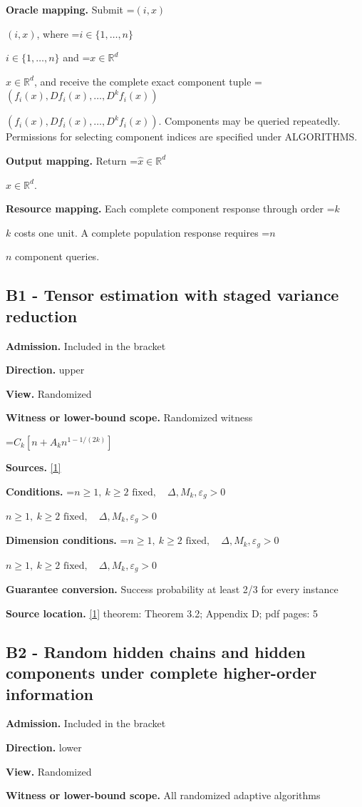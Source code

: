 \documentclass[10pt,a4paper]{article}
\newcommand{\AtlasMath}[1]{\par\begingroup\centering\setbox0=\hbox{$\displaystyle #1$}\ifdim\wd0>1.4\linewidth\typeout{ATLAS WIDE FORMULA: \the\wd0}\fi\ifdim\wd0>\linewidth\resizebox{\linewidth}{!}{\box0}\else\box0\fi\par\endgroup}
\newcommand{\AtlasInlineMath}[1]{\begingroup\setbox0=\hbox{$#1$}\ifdim\wd0>.4\linewidth\endgroup\AtlasMath{#1}\else\endgroup$#1$\fi}
\begin{document}
\textbf{Oracle mapping.} Submit \AtlasInlineMath{(i,x)}, where \AtlasInlineMath{i\in\{1,\ldots,n\}} and \AtlasInlineMath{x\in\mathbb{R}^d}, and receive the complete exact component tuple \AtlasInlineMath{(f_i(x),Df_i(x),\ldots,D^{k}f_i(x))}. Components may be queried repeatedly. Permissions for selecting component indices are specified under ALGORITHMS.

\textbf{Output mapping.} Return \AtlasInlineMath{\widehat{x}\in \mathbb{R}^d}.

\textbf{Resource mapping.} Each complete component response through order \AtlasInlineMath{k} costs one unit. A complete population response requires \AtlasInlineMath{n} component queries.

\subsection{B1 - Tensor estimation with staged variance reduction}
\textbf{Admission.} Included in the bracket

\textbf{Direction.} upper

\textbf{View.} Randomized

\textbf{Witness or lower-bound scope.} Randomized witness

\AtlasMath{C_k[n+A_kn^{1-1/(2k)}]}
\textbf{Sources.} \href{https://arxiv.org/pdf/2609.28202v2}{[1]}

\textbf{Conditions.} \AtlasInlineMath{n\ge1,\ k\ge2\text{ fixed},\quad\Delta,M_k,\varepsilon_g>0}

\textbf{Dimension conditions.} \AtlasInlineMath{n\ge1,\ k\ge2\text{ fixed},\quad\Delta,M_k,\varepsilon_g>0}

\textbf{Guarantee conversion.} Success probability at least 2/3 for every instance

\textbf{Source location.} \href{https://arxiv.org/pdf/2609.28202v2}{[1]} theorem: Theorem 3.2; Appendix D; pdf pages: 5

\subsection{B2 - Random hidden chains and hidden components under complete higher-order information}
\textbf{Admission.} Included in the bracket

\textbf{Direction.} lower

\textbf{View.} Randomized

\textbf{Witness or lower-bound scope.} All randomized adaptive algorithms
\end{document}
